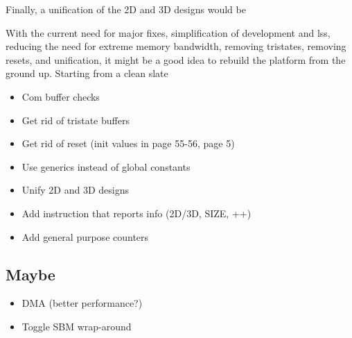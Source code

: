 Finally, a unification of the 2D and 3D designs would be \TODO

With the current need for major fixes, simplification of development and lss, reducing the need for extreme memory bandwidth, removing tristates, removing resets, and unification, it might be a good idea to rebuild the platform from the ground up.
Starting from a clean slate \TODO

\begin{itemize}
    \item Com buffer checks
    \item Get rid of tristate buffers \cite{koch2008buses}
    \item Get rid of reset (init values in \cite{ug687} page 55-56, \cite{wp272} page 5)
    \item Use generics instead of global constants
    \item Unify 2D and 3D designs
    \item Add instruction that reports info (2D/3D, SIZE, ++)
    \item Add general purpose counters
\end{itemize}

\subsection{Maybe}

\begin{itemize}
    \item DMA (better performance?)
    \item Toggle SBM wrap-around
\end{itemize}

